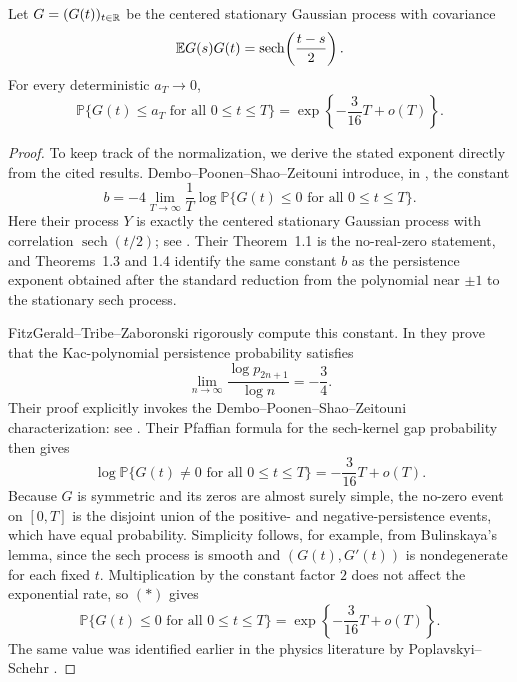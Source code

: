 \begin{lemma}
\label{lem:sech-persistence}
Let $G=(G(t))_{t\in\mathbb{R}}$ be the centered stationary Gaussian process with covariance
\[
    \mathbb{E} G(s)G(t)
    =
    \operatorname{sech}\!\left(\frac{t-s}{2}\right).
\]
For every deterministic $a_T\to0$,
\begin{equation}
\label{eq:sech-persistence}
    \mathbb P\{G(t)\le a_T\text{ for all }0\le t\le T\}
    =
    \exp\!\left\{-\frac{3}{16}T+o(T)\right\}.
\end{equation}
\end{lemma}

\begin{proof}
To keep track of the normalization, we derive the stated exponent directly
from the cited results. Dembo--Poonen--Shao--Zeitouni introduce, in
\cite[equation~(1.3)]{DemboPoonenShaoZeitouni2002}, the constant
\[
    b
    =
    -4\lim_{T\to\infty}
    \frac1T
    \log
    \mathbb P\{G(t)\le0\text{ for all }0\le t\le T\}.
\]
Here their process \(Y\) is exactly the centered stationary Gaussian process
with correlation \(\operatorname{sech}(t/2)\); see
\cite[equation~(1.4) and the sentence following it]{DemboPoonenShaoZeitouni2002}.
Their Theorem~1.1 is the no-real-zero statement, and Theorems~1.3 and 1.4
identify the same constant \(b\) as the persistence exponent obtained after
the standard reduction from the polynomial near \(\pm1\) to the stationary sech
process.

FitzGerald--Tribe--Zaboronski rigorously compute this constant. In \cite[Proposition~5]{FitzGeraldTribeZaboronski2022} they prove that the Kac-polynomial persistence probability satisfies
\[
    \lim_{n\to\infty}
    \frac{\log p_{2n+1}}{\log n}
    =
    -\frac34.
\]
Their proof explicitly invokes the Dembo--Poonen--Shao--Zeitouni characterization: see \cite[equations~(19)--(20)]{FitzGeraldTribeZaboronski2022}. Their Pfaffian formula for the sech-kernel gap probability then gives \cite[equation~(21)]{FitzGeraldTribeZaboronski2022}
\[
    \log \mathbb P\{G(t)\ne0\text{ for all }0\le t\le T\}
    =
    -\frac{3}{16}T+o(T).
    \tag{*}
\]
Because $G$ is symmetric and its zeros are almost surely simple, the no-zero event on $[0,T]$ is the disjoint union of the positive- and negative-persistence events, which have equal probability. Simplicity follows, for example, from Bulinskaya's lemma, since the sech process is smooth and $(G(t),G'(t))$ is nondegenerate for each fixed $t$. Multiplication by the constant factor $2$ does not affect the exponential rate, so $(*)$ gives
\[
    \mathbb P\{G(t)\le0\text{ for all }0\le t\le T\}
    =
    \exp\!\left\{-\frac{3}{16}T+o(T)\right\}.
\]
The same value was identified earlier in the physics literature by Poplavskyi--Schehr \cite{PoplavskyiSchehr2018}.


\end{proof}
